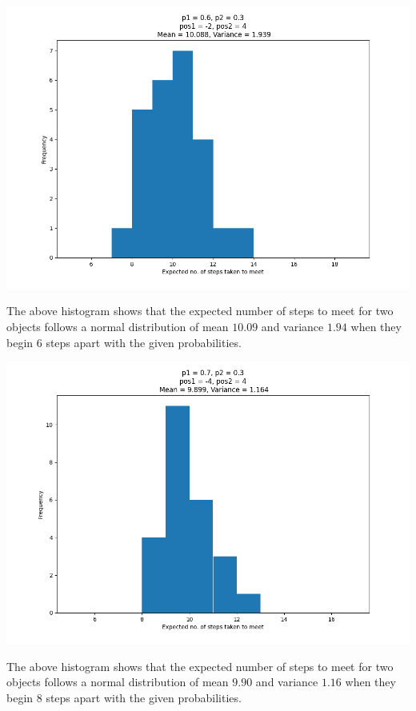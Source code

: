 \documentclass[answers]{exam}
\begin{document}
\begin{center}
  \includegraphics[scale = 0.5]{Q1_histograms/1.3/Q1.3 _p1 = 0.6_p2 = 0.3_pos1 = -2_pos2 = 4.png}
\end{center}

The above histogram shows that the expected number of steps to meet for two objects follows a normal distribution of mean $10.09$ and variance $1.94$ when they begin 6 steps apart with the given probabilities. \\
\begin{center}\includegraphics[scale = 0.5]{Q1_histograms/1.3/Q1.3 _p1 = 0.7_p2 = 0.3_pos1 = -4_pos2 = 4.png}\end{center}
The above histogram shows that the expected number of steps to meet for two objects follows a normal distribution of mean $9.90$ and variance $1.16$ when they begin 8 steps apart with the given probabilities. \\
\end{document}
